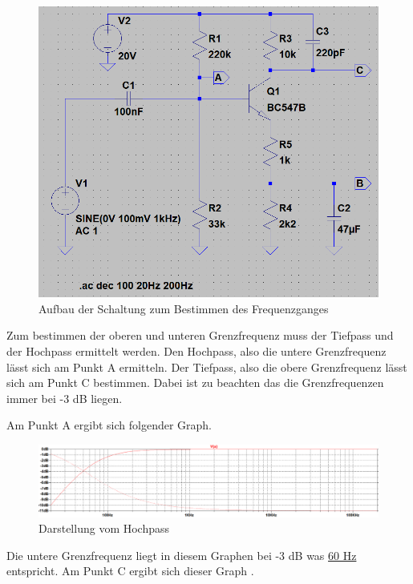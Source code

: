             \begin{figure}[h!]
                \centering
                \includegraphics[width=0.7\linewidth]{323.PNG}
                \caption{Aufbau der Schaltung zum Bestimmen des Frequenzganges}
            \end{figure}

            Zum bestimmen der oberen und unteren Grenzfrequenz muss der Tiefpass und der Hochpass ermittelt werden. Den Hochpass, also die untere Grenzfrequenz lässt sich am Punkt A ermitteln. Der Tiefpass, also die obere Grenzfrequenz lässt sich am Punkt C bestimmen. Dabei ist zu beachten das die Grenzfrequenzen immer bei -3 dB liegen.

            Am Punkt A ergibt sich folgender Graph.
            \begin{figure}[h!]
                \centering
                \includegraphics[width=\linewidth]{3232.PNG}
                \caption{Darstellung vom Hochpass}
            \end{figure}
            Die untere Grenzfrequenz liegt in diesem Graphen bei -3 dB was  \underline{60 Hz} entspricht.
            Am Punkt C ergibt sich dieser Graph .
            
